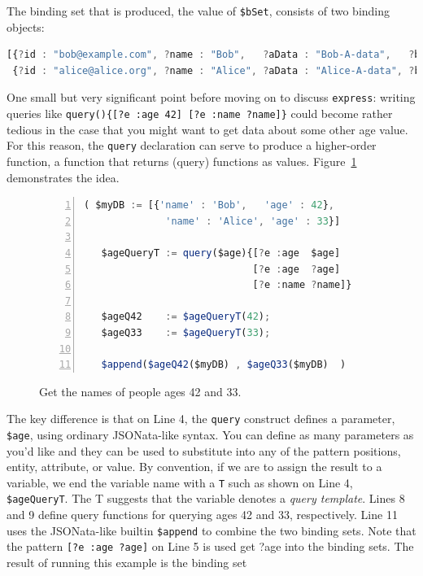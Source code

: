 \documentclass[9pt,letterpaper]{article}
\newcommand{\stt}[1]{\texttt{#1}} %
\begin{document}
The binding set that is produced, the value of \stt{\$bSet}, consists of two binding objects:

\begin{lstlisting}[language=JavaScript,numbers=none,basicstyle=\ttfamily\scriptsize]
[{?id : "bob@example.com", ?name : "Bob",   ?aData : "Bob-A-data",   ?bData : "Bob-B-data"  },
 {?id : "alice@alice.org", ?name : "Alice", ?aData : "Alice-A-data", ?bData : "Alice-B-data"}]
\end{lstlisting} \vspace{-2em}

One small but very significant point before moving on to discuss \stt{express}:
writing queries like \stt{query()\{[?e :age 42] [?e :name ?name]\}} could become rather tedious in the case that you might want to get data about some other age value.
For this reason, the \stt{query} declaration can serve to produce a higher-order function, a function that returns (query) functions as values. Figure~\ref{code:higher-order-query} demonstrates the idea.

\begin{figure}[H]
    \caption{Get the names of people ages 42 and 33.}
    \label{code:higher-order-query}
\begin{lstlisting}[language=JavaScript,numberstyle=\scriptsize,basicstyle=\ttfamily\scriptsize,numbers=left,stepnumber=1,breaklines=true]
 ( $myDB := [{'name' : 'Bob',   'age' : 42},
              'name' : 'Alice', 'age' : 33}]

   $ageQueryT := query($age){[?e :age  $age]
                             [?e :age  ?age]
                             [?e :name ?name]}

   $ageQ42    := $ageQueryT(42);
   $ageQ33    := $ageQueryT(33);

   $append($ageQ42($myDB) , $ageQ33($myDB)  )
\end{lstlisting}
\end{figure} \vspace{-2em}

The key difference is that on Line 4, the \stt{query} construct defines a parameter, \stt{\$age},  using ordinary JSONata-like syntax.
You can define as many parameters as you'd like and they can be used to substitute into any of the pattern positions, entity, attribute, or value.
By convention, if we are to assign the result to a variable, we end the variable name with a \stt{T} such as shown on Line 4, \stt{\$ageQueryT}.
The T suggests that the variable denotes a \textit{query template}.
Lines 8 and 9 define query functions for querying ages 42 and 33, respectively.
Line 11 uses the JSONata-like builtin \stt{\$append} to combine the two binding sets.
Note that the pattern \stt{[?e :age ?age]} on Line 5 is used get ?age into the binding sets.
The result of running this example is the binding set
\end{document}
